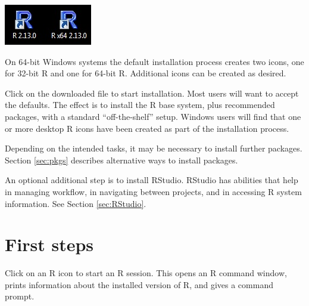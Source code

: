 \begin{marginfigure}
\begin{center}
\begin{minipage}[c]{0.8\textwidth}
\includegraphics{figs-inc/01i-icons.jpg}
\end{minipage}
\end{center}
\caption{On 64-bit Windows systems the default installation
process creates two icons, one for 32-bit R and one for 64-bit R.
Additional icons can be created as desired.
}
\end{marginfigure}

Click on the downloaded file to start installation.  Most users will
want to accept the defaults.  The effect is to install the R base
system, plus recommended packages, with a standard ``off-the-shelf''
setup.  Windows users will find that one or more desktop R icons have
been created as part of the installation process.

Depending on the intended tasks, it may be necessary to install
further packages. Section \ref{sec:pkgs} describes alternative
ways to install packages.

An optional additional step is to install RStudio.
  RStudio has abilities that
help in managing workflow, in navigating between projects, and in
accessing R system information.  See Section \ref{sec:RStudio}.

\section{First steps}\label{sec:step1}

Click on an R icon to start an R session.  This opens an R command
window, prints information about the installed version of R, and
gives a command prompt.

